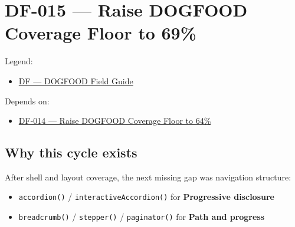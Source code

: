 \chapter{DF-015 --- Raise DOGFOOD Coverage Floor to 69\%}\label{record-077}

\smallskip

Legend:

\begin{itemize}
\tightlist
\item
  \href{https://github.com/flyingrobots/bijou/blob/1853ad902f6bf219326409e7f743a5a1d6517dbc/docs/legends/DF-dogfood-field-guide.md}{DF --- DOGFOOD Field Guide}
\end{itemize}

Depends on:

\begin{itemize}
\tightlist
\item
  \href{https://github.com/flyingrobots/bijou/blob/cbd70612140e7a450d764b3c7be1c6af878b99bc/docs/design/DF-014-raise-dogfood-coverage-floor-to-64-percent.md}{DF-014 --- Raise DOGFOOD Coverage Floor to 64\%}
\end{itemize}

\section{Why this cycle exists}\label{record-077-why-this-cycle-exists}

After shell and layout coverage, the next missing gap was navigation structure:

\begin{itemize}
\tightlist
\item
  \texttt{a\allowbreak{}c\allowbreak{}c\allowbreak{}o\allowbreak{}r\allowbreak{}d\allowbreak{}i\allowbreak{}o\allowbreak{}n\allowbreak{}(\allowbreak{})} / \texttt{i\allowbreak{}n\allowbreak{}t\allowbreak{}e\allowbreak{}r\allowbreak{}a\allowbreak{}c\allowbreak{}t\allowbreak{}i\allowbreak{}v\allowbreak{}e\allowbreak{}A\allowbreak{}c\allowbreak{}c\allowbreak{}o\allowbreak{}r\allowbreak{}d\allowbreak{}i\allowbreak{}o\allowbreak{}n\allowbreak{}(\allowbreak{})} for \textbf{Progressive disclosure}
\item
  \texttt{b\allowbreak{}r\allowbreak{}e\allowbreak{}a\allowbreak{}d\allowbreak{}c\allowbreak{}r\allowbreak{}u\allowbreak{}m\allowbreak{}b\allowbreak{}(\allowbreak{})} / \texttt{s\allowbreak{}t\allowbreak{}e\allowbreak{}p\allowbreak{}p\allowbreak{}e\allowbreak{}r\allowbreak{}(\allowbreak{})} / \texttt{p\allowbreak{}a\allowbreak{}g\allowbreak{}i\allowbreak{}n\allowbreak{}a\allowbreak{}t\allowbreak{}o\allowbreak{}r\allowbreak{}(\allowbreak{})} for \textbf{Path and progress}
\end{itemize}

